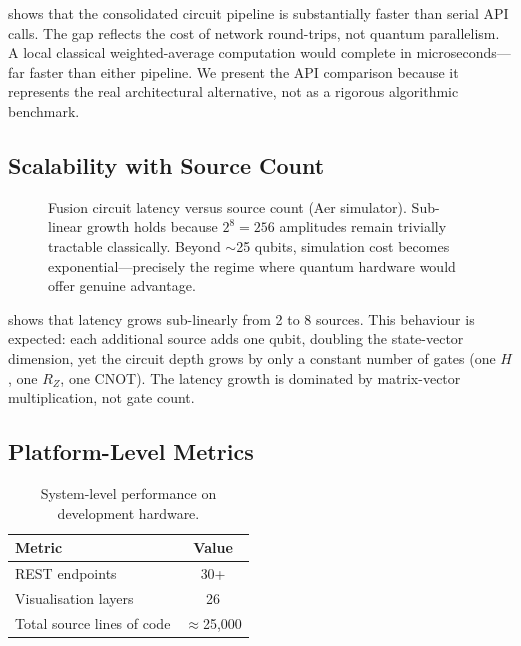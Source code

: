 \documentclass[conference]{IEEEtran}
\begin{document}
 shows that the consolidated circuit pipeline is
substantially faster than serial API calls.
The gap reflects the cost of network round-trips, not quantum parallelism.
A local classical weighted-average computation would complete in
microseconds---far faster than either pipeline.
We present the API comparison because it represents the real architectural
alternative, not as a rigorous algorithmic benchmark.

\subsection{Scalability with Source Count}

\begin{figure}[t]
\centering
{}
\caption{Fusion circuit latency versus source count (Aer simulator).
Sub-linear growth holds because $2^8 = 256$ amplitudes remain
trivially tractable classically. Beyond $\sim$25 qubits, simulation
cost becomes exponential---precisely the regime where quantum hardware
would offer genuine advantage.}\label{fig:scale}
\end{figure}

 shows that latency grows sub-linearly from 2 to 8
sources.
This behaviour is expected: each additional source adds one qubit,
doubling the state-vector dimension, yet the circuit depth grows by only
a constant number of gates (one $H$, one $R_Z$, one CNOT).
The latency growth is dominated by matrix-vector multiplication, not
gate count.

\subsection{Platform-Level Metrics}

\begin{table}[t]
\centering
\caption{System-level performance on development hardware.}\label{tab:sysperf}
\begin{tabular}{@{}lc@{}}
\toprule
\textbf{Metric}                         & \textbf{Value} \\
\midrule
REST endpoints                          & 30+            \\
Visualisation layers                    & 26             \\
Total source lines of code              & $\approx$25,000\\
\bottomrule
\end{tabular}
\end{table}
\end{document}
